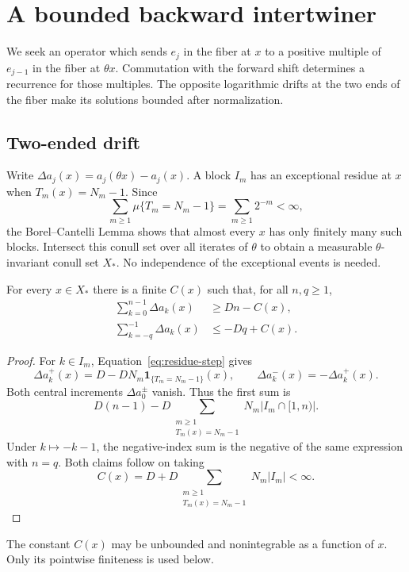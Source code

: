 \section{A bounded backward intertwiner}\label{sec:intertwiner}
We seek an operator which sends $e_j$ in the fiber at $x$ to a positive multiple of $e_{j-1}$ in the fiber at $\theta x$. Commutation with the forward shift determines a recurrence for those multiples. The opposite logarithmic drifts at the two ends of the fiber make its solutions bounded after normalization.

\subsection{Two-ended drift}
Write $\Delta a_j(x)=a_j(\theta x)-a_j(x)$. A block $I_m$ has an exceptional residue at $x$ when $T_m(x)=N_m-1$. Since
\[
 \sum_{m\ge1}\mu\{T_m=N_m-1\}=\sum_{m\ge1}2^{-m}<\infty,
\]
the Borel--Cantelli Lemma shows that almost every $x$ has only finitely many such blocks. Intersect this conull set over all iterates of $\theta$ to obtain a measurable $\theta$-invariant conull set $X_*$. No independence of the exceptional events is needed.

\begin{lemma}\label{lem:drift}
For every $x\in X_*$ there is a finite $C(x)$ such that, for all $n,q\ge1$,
\begin{align}
 \sum_{k=0}^{n-1}\Delta a_k(x)&\ge Dn-C(x),\label{eq:positive-drift}\\
 \sum_{k=-q}^{-1}\Delta a_k(x)&\le-Dq+C(x).\label{eq:negative-drift}
\end{align}
\end{lemma}
\begin{proof}
For $k\in I_m$, Equation~\eqref{eq:residue-step} gives
\[
 \Delta a_k^+(x)=D-DN_m\mathbf1_{\{T_m=N_m-1\}}(x),
 \qquad \Delta a_k^-(x)=-\Delta a_k^+(x).
\]
Both central increments $\Delta a_0^\pm$ vanish. Thus the first sum is
\[
 D(n-1)-D\sum_{\substack{m\ge1\\T_m(x)=N_m-1}}
       N_m\bigl|I_m\cap[1,n)\bigr|.
\]
Under $k\mapsto-k-1$, the negative-index sum is the negative of the same expression with $n=q$. Both claims follow on taking
\[
 C(x)=D+D\sum_{\substack{m\ge1\\T_m(x)=N_m-1}}N_m|I_m|<\infty.
\]
\end{proof}

The constant $C(x)$ may be unbounded and nonintegrable as a function of $x$. Only its pointwise finiteness is used below.


